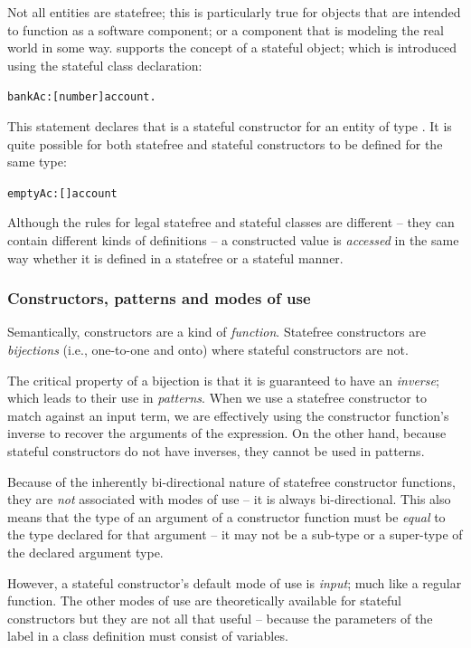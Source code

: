 Not all entities are statefree; this is particularly true for objects that are intended to function as a software component; or a component that is modeling the real world in some way. \go supports the concept of a stateful object; which is introduced using the stateful class declaration:
\begin{alltt}
bankAc:[number]\sconarrow{}account.
\end{alltt}
This statement declares that  is a stateful constructor for an entity of type . It is quite possible for both statefree and stateful constructors to be defined for the same type:
\begin{alltt}
emptyAc:[]\conarrow{}account
\end{alltt}
Although the rules for legal statefree and stateful classes are different -- they can contain different kinds of definitions -- a constructed value is \emph{accessed} in the same way whether it is defined in a statefree or a stateful manner. 

\subsubsection{Constructors, patterns and modes of use}
Semantically, constructors are a kind of \emph{function}. Statefree constructors are \emph{bijections} (i.e., one-to-one and onto) where stateful constructors are not.

The critical property of a bijection is that it is guaranteed to have an \emph{inverse}; which leads to their use in \emph{patterns}. When we use a statefree constructor to match against an input term, we are effectively using the constructor function's inverse to recover the arguments of the expression. On the other hand, because stateful constructors do not have inverses, they cannot be used in patterns.

Because of the inherently bi-directional nature of statefree constructor functions, they are \emph{not} associated with modes of use -- it is always bi-directional. This also means that the type of an argument of a constructor function must be \emph{equal} to the type declared for that argument -- it may not be a sub-type or a super-type of the declared argument type.

However, a stateful constructor's default mode of use is \emph{input}; much like a regular function. The other modes of use are theoretically available for stateful constructors but they are not all that useful -- because the parameters of the label in a class definition must consist of variables.

